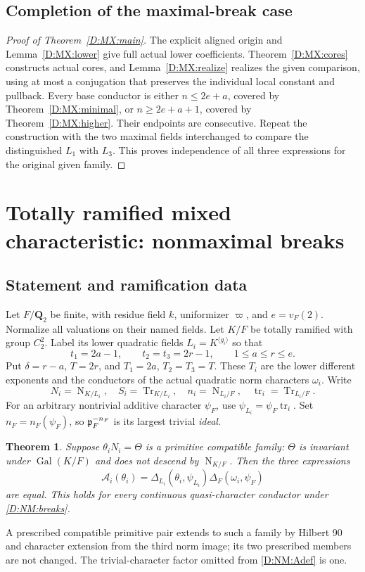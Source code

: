 \documentclass[11pt]{amsart}
\newtheorem{theorem}{Theorem}[section]
\theoremstyle{definition}
\theoremstyle{remark}
\newcommand{\Tr}{\operatorname{Tr}}
\newcommand{\Nm}{\operatorname{N}}
\newcommand{\Gal}{\operatorname{Gal}}
\begin{document}
\subsection{Completion of the maximal-break case}
\begin{proof}[Proof of Theorem~\ref{D:MX:main}]
The explicit aligned origin and Lemma~\ref{D:MX:lower} give full actual lower
coefficients. Theorem~\ref{D:MX:cores} constructs actual cores, and
Lemma~\ref{D:MX:realize} realizes the given comparison, using at most a
conjugation that preserves the individual local constant and pullback.
Every base conductor is either $n\le2e+a$, covered by
Theorem~\ref{D:MX:minimal}, or $n\ge2e+a+1$, covered by
Theorem~\ref{D:MX:higher}. Their endpoints are consecutive.
Repeat the construction with the two maximal fields interchanged to
compare the distinguished $L_1$ with $L_3$. This proves independence
of all three expressions for the original given family.
\end{proof}


\section{Totally ramified mixed characteristic: nonmaximal breaks}\label{sec:dyadic-nonmaximal}
\subsection{Statement and ramification data}
Let $F/\mathbf Q_2$ be finite, with residue field $k$, uniformizer
$\varpi$, and $e=v_F(2)$. Normalize all valuations on their named fields.
Let $K/F$ be totally ramified with group $C_2^2$. Label its lower
quadratic fields $L_i=K^{\langle g_i\rangle}$ so that
\begin{equation}\label{D:NM:breaks}
 t_1=2a-1,\qquad t_2=t_3=2r-1,\qquad 1\le a\le r\le e.
\end{equation}
Put $\delta=r-a$, $T=2r$, and $T_1=2a$, $T_2=T_3=T$.
These $T_i$ are the lower different exponents and the conductors of the
actual quadratic norm characters $\omega_i$. Write
\[
 N_i=\Nm_{K/L_i},\quad S_i=\Tr_{K/L_i},\quad
 n_i=\Nm_{L_i/F},\quad \operatorname{tr}_i=\Tr_{L_i/F}.
\]
For an arbitrary nontrivial additive character $\psi_F$, use
$\psi_{L_i}=\psi_F\operatorname{tr}_i$. Set $n_F=n_F(\psi_F)$, so
$\mathfrak p_F^{-n_F}$ is its largest trivial \emph{ideal}.
\begin{theorem}\label{D:NM:main}
Suppose $\theta_iN_i=\Theta$ is a primitive compatible family: $\Theta$
is invariant under $\Gal(K/F)$ and does not descend by $\Nm_{K/F}$.
Then the three expressions
\begin{equation}\label{D:NM:Adef}
 \mathcal A_i(\theta_i)=
 \Delta_{L_i}(\theta_i,\psi_{L_i})\Delta_F(\omega_i,\psi_F)
\end{equation}
are equal. This holds for every continuous quasi-character conductor
under \eqref{D:NM:breaks}.
\end{theorem}
A prescribed compatible primitive pair extends to such a family by
Hilbert 90 and character extension from the third norm image; its two
prescribed members are not changed. The trivial-character factor omitted
from \eqref{D:NM:Adef} is one.
\end{document}

